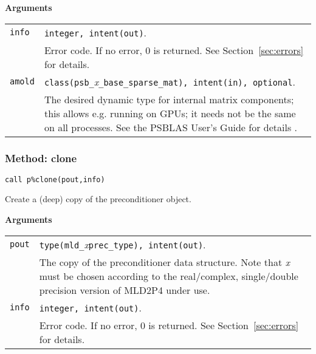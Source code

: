 {\baselineskip\noindent\large\bfseries Arguments} \smallskip

\begin{tabular}{p{1.2cm}p{12cm}}
\verb|info|   & \verb|integer, intent(out)|.\\
              & Error code. If no error, 0 is returned. See Section~\ref{sec:errors} for details.\\
\verb|amold| & \verb|class(psb_|\emph{x}\verb|_base_sparse_mat), intent(in), optional|. \\
 & The desired dynamic type for internal matrix
  components; this allows e.g. running on GPUs; it needs not be the
  same on all processes. See the PSBLAS User's Guide for
  details \cite{PSBLASGUIDE}. \\
\end{tabular}


\subsubsection{Method: clone}
  
\begin{center}
\verb|call p%clone(pout,info)|\\
\end{center}

\noindent
Create a (deep) copy of the preconditioner object. 

{\baselineskip\noindent\large\bfseries Arguments} \smallskip

\begin{tabular}{p{1.2cm}p{12cm}}
\verb|pout|  & \verb|type(mld_|\emph{x}\verb|prec_type), intent(out)|.\\
              & The copy of the preconditioner data structure. Note
                that \emph{x} must be chosen according 
                to the real/complex, single/double precision version of MLD2P4 under use.\\
\verb|info|   & \verb|integer, intent(out)|.\\
              & Error code. If no error, 0 is returned. See Section~\ref{sec:errors} for details.\\
\end{tabular}



